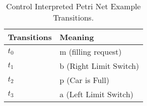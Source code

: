 \begin{table}[H]
\caption{Control Interpreted Petri Net Example Transitions.}
\centering
\begin{tabular}{M{5cm}M{10cm}}
Transitions & Meaning\\
\hline
\hyperlink{cipnExampleNet:t0}{\hypertarget{cipnExampleTable:t0}{$t_{0}$}} & m (filling request)\\
\hyperlink{cipnExampleNet:t1}{\hypertarget{cipnExampleTable:t1}{$t_{1}$}} & b (Right Limit Switch)\\
\hyperlink{cipnExampleNet:t2}{\hypertarget{cipnExampleTable:t2}{$t_{2}$}} & p (Car is Full)\\
\hyperlink{cipnExampleNet:t3}{\hypertarget{cipnExampleTable:t3}{$t_{3}$}} & a (Left Limit Switch)\\
\end{tabular}
\end{table}
